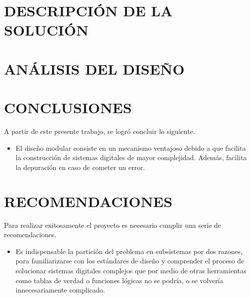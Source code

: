 \documentclass[journal,trans]{IEEEtran}
\begin{document}
\section{DESCRIPCIÓN DE LA SOLUCIÓN}




\section{ANÁLISIS DEL DISEÑO}


\section{CONCLUSIONES}
A partir de este presente trabajo, se logró concluir lo siguiente.
\begin{itemize}
    \item El diseño modular consiste en un mecanismo ventajoso debido a que facilita la construcción de sistemas digitales de mayor complejidad. Además, facilita la depuración en caso de cometer un error.
\end{itemize}

\section{RECOMENDACIONES}
Para realizar exitosamente el proyecto es necesario cumplir una serie de recomendaciones.
\begin{itemize}
    \item Es indispensable la partición del problema en subsistemas por dos razones, para familiarizarse con los estándares de diseño y comprender el proceso de solucionar sistemas digitales complejos que por medio de otras herramientas como tablas de verdad o funciones lógicas no se podría, o se volvería innecesariamente complicado.
\end{itemize}
\end{document}
